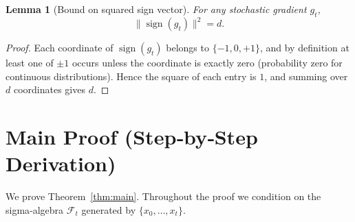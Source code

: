 \documentclass[11pt]{article}
\newtheorem{lemma}{Lemma}
\newcommand{\sign}{\operatorname{sign}}
\begin{document}
\begin{lemma}[Bound on squared sign vector]\label{lem:squared}
For any stochastic gradient $g_t$,
\[
\|\sign(g_t)\|^{2}=d .
\tag{9}
\]
\end{lemma}
\begin{proof}
Each coordinate of $\sign(g_t)$ belongs to $\{-1,0,+1\}$, and by definition at least one of $\pm1$ occurs unless the coordinate is exactly zero (probability zero for continuous distributions). Hence the square of each entry is $1$, and summing over $d$ coordinates gives $d$.
\end{proof}

\newpage
\section*{Main Proof (Step‑by‑Step Derivation)}
We prove Theorem~\ref{thm:main}. Throughout the proof we condition on the sigma‑algebra $\mathcal{F}_t$ generated by $\{x_0,\dots,x_t\}$.
\end{document}
